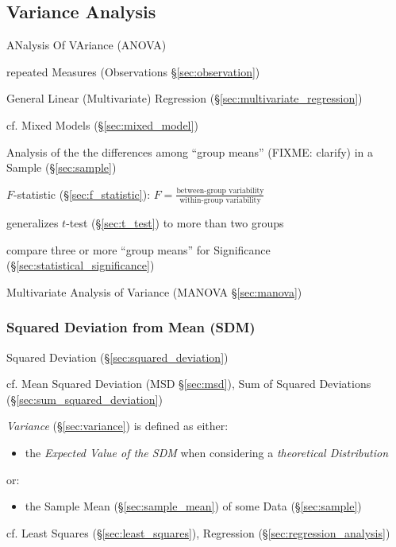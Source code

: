 \subsection{Variance Analysis}\label{sec:variance_analysis}

ANalysis Of VAriance (ANOVA)

repeated Measures (Observations \S\ref{sec:observation})

General Linear (Multivariate) Regression (\S\ref{sec:multivariate_regression})

cf. Mixed Models (\S\ref{sec:mixed_model})

Analysis of the the differences among ``group means'' (FIXME: clarify) in a
Sample (\S\ref{sec:sample})

$F$-statistic (\S\ref{sec:f_statistic}):
$F = \frac{\text{between-group variability}}{\text{within-group variability}}$

generalizes $t$-test (\S\ref{sec:t_test}) to more than two groups

compare three or more ``group means'' for Significance
(\S\ref{sec:statistical_significance})

\fist Multivariate Analysis of Variance (MANOVA \S\ref{sec:manova})



\subsubsection{Squared Deviation from Mean (SDM)}\label{sec:sdm}

\fist Squared Deviation (\S\ref{sec:squared_deviation})

cf. Mean Squared Deviation (MSD \S\ref{sec:msd}), Sum of Squared
Deviations (\S\ref{sec:sum_squared_deviation})

\emph{Variance} (\S\ref{sec:variance}) is defined as either:
\begin{itemize}
  \item the \emph{Expected Value of the SDM} when considering a
    \emph{theoretical Distribution}
\end{itemize}
or:
\begin{itemize}
  \item the Sample Mean (\S\ref{sec:sample_mean}) of some Data
    (\S\ref{sec:sample})
\end{itemize}

cf. Least Squares (\S\ref{sec:least_squares}), Regression
(\S\ref{sec:regression_analysis})



